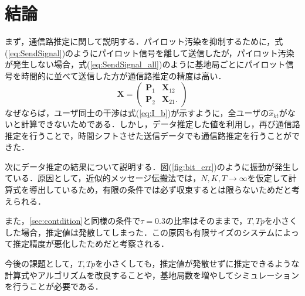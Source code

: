 \chapter{結論}
まず，通信路推定に関して説明する．パイロット汚染を抑制するために，式(\ref{eq:SendSignal})のようにパイロット信号を離して送信したが，パイロット汚染が発生しない場合，式(\ref{eq:SendSignal_all})のように基地局ごとにパイロット信号を時間的に並べて送信した方が通信路推定の精度は高い．
\begin{equation} 
	\label{eq:SendSignal_all}
	\boldsymbol{X} =  \left(
		\begin{array}{cc}
			\boldsymbol{P}_{1} &\boldsymbol{X}_{12}\\
			\boldsymbol{P}_{2} &\boldsymbol{X}_{21}.
		\end{array}
	\right)
\end{equation}
なぜならば，ユーザ同士の干渉は式(\ref{eq:I_b})が示すように，全ユーザの$\hat{x}_{kt}$がないと計算できないためである．しかし，データ推定した値を利用し，再び通信路推定を行うことで，時間シフトさせた送信データでも通信路推定を行うことができた．

次にデータ推定の結果について説明する．図(\ref{fig:bit_err})のように振動が発生している．原因として，近似的メッセージ伝搬法では，$N,K,T\to \infty$を仮定して計算式を導出しているため，有限の条件では必ず収束するとは限らないためだと考えられる\cite{kabashima}．

また，\ref{sec:contdition}と同様の条件で$\tau=0.3$の比率はそのままで，$T,Tp$を小さくした場合，推定値は発散してしまった．この原因も有限サイズのシステムによって推定精度が悪化したためだと考察される．

今後の課題として，$T,Tp$を小さくしても，推定値が発散せずに推定できるような計算式やアルゴリズムを改良することや，基地局数を増やしてシミュレーションを行うことが必要である．